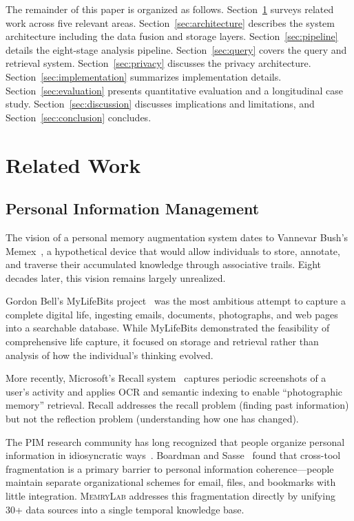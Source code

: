 \documentclass[manuscript,review]{acmart}
\begin{document}
The remainder of this paper is organized as follows.
Section~\ref{sec:related} surveys related work across five relevant areas.
Section~\ref{sec:architecture} describes the system architecture including the data fusion and storage layers.
Section~\ref{sec:pipeline} details the eight-stage analysis pipeline.
Section~\ref{sec:query} covers the query and retrieval system.
Section~\ref{sec:privacy} discusses the privacy architecture.
Section~\ref{sec:implementation} summarizes implementation details.
Section~\ref{sec:evaluation} presents quantitative evaluation and a longitudinal case study.
Section~\ref{sec:discussion} discusses implications and limitations, and Section~\ref{sec:conclusion} concludes.

\section{Related Work}
\label{sec:related}

\subsection{Personal Information Management}
\label{sec:related-pim}

The vision of a personal memory augmentation system dates to Vannevar Bush's Memex~\cite{bush1945memex}, a hypothetical device that would allow individuals to store, annotate, and traverse their accumulated knowledge through associative trails.
Eight decades later, this vision remains largely unrealized.

Gordon Bell's MyLifeBits project~\cite{gemmell2002mylifebits,bell2009total} was the most ambitious attempt to capture a complete digital life, ingesting emails, documents, photographs, and web pages into a searchable database.
While MyLifeBits demonstrated the feasibility of comprehensive life capture, it focused on storage and retrieval rather than analysis of how the individual's thinking evolved.

More recently, Microsoft's Recall system~\cite{microsoft2024recall} captures periodic screenshots of a user's activity and applies OCR and semantic indexing to enable ``photographic memory'' retrieval.
Recall addresses the recall problem (finding past information) but not the reflection problem (understanding how one has changed).

The PIM research community has long recognized that people organize personal information in idiosyncratic ways~\cite{jones2007pim,lansdale1988psychology,whittaker2011personal}.
Boardman and Sasse~\cite{boardman2004stuff} found that cross-tool fragmentation is a primary barrier to personal information coherence---people maintain separate organizational schemes for email, files, and bookmarks with little integration.
\textsc{MemryLab} addresses this fragmentation directly by unifying 30+ data sources into a single temporal knowledge base.
\end{document}
